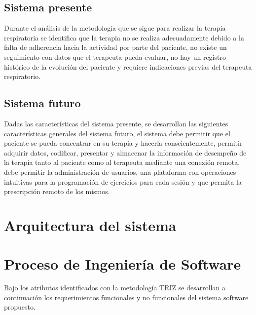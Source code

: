 \documentclass[12pt]{article}
\begin{document}

\subsection{Sistema presente} Durante el análisis de la metodología que se sigue para realizar la terapia respiratoria se identifica que la terapia no se realiza adecuadamente debido a la falta de adherencia hacia la actividad por parte del paciente, no existe un seguimiento con datos que el terapeuta pueda evaluar, no hay un registro histórico de la evolución del paciente y requiere indicaciones previas del terapeuta respiratorio.

\subsection{Sistema futuro} Dadas las características del sistema presente, se desarrollan las siguientes características generales del sistema futuro, el sistema debe permitir que el paciente se pueda concentrar en su terapia y hacerla conscientemente, permitir adquirir datos, codificar, presentar y almacenar la información de desempeño de la terapia tanto al paciente como al terapeuta mediante una conexión remota, debe permitir la administración de usuarios, una plataforma con operaciones intuitivas para la programación de ejercicios para cada sesión y que permita la prescripción remoto de los mismos.



\section{Arquitectura del sistema}









\section{Proceso de Ingeniería de Software}

Bajo los atributos identificados con la metodología TRIZ se desarrollan a continuación los requerimientos funcionales y no funcionales del sistema software propuesto.
\end{document}
